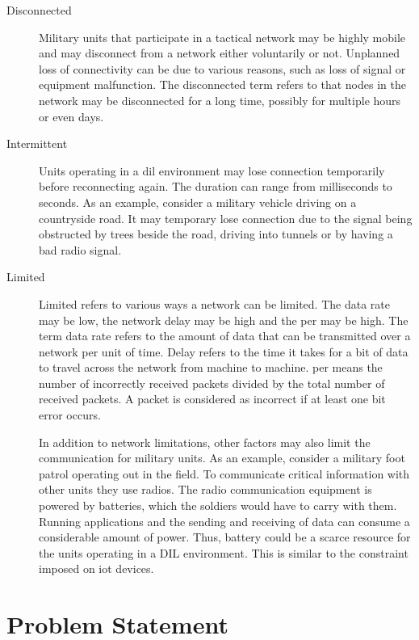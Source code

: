 \begin{description}
\item[Disconnected]

Military units that participate in a tactical network may be highly mobile and
may disconnect from a network either voluntarily or not. Unplanned loss of
connectivity can be due to various reasons, such as loss of signal or equipment
malfunction.  The disconnected term refers to that nodes in the network may be
disconnected for a long time, possibly for multiple hours or even days.

\item[Intermittent]

Units operating in a \gls{dil} environment may lose connection temporarily before
reconnecting again. The duration can range from milliseconds to seconds. As an
example, consider a military vehicle driving on a countryside road. It may
temporary lose connection due to the signal being obstructed by trees beside
the road, driving into tunnels or by having a bad radio signal.

\item[Limited] Limited refers to various ways a network can be limited. The data
rate may be low, the network delay may be high and the \gls{per} may be high.
The term data rate refers to the amount of data that can be transmitted over a
network per unit of time. Delay refers to the time it takes for a bit of data to
travel across the network from machine to machine. \gls{per} means the number of
incorrectly received packets divided by the total number of received packets. A
packet is considered as incorrect if at least one bit error occurs.

In addition to network limitations, other factors may also limit the
communication for military units. As an example, consider a military foot patrol
operating out in the field. To communicate critical information with other units
they use radios. The radio communication equipment is powered by batteries,
which the soldiers would have to carry with them. Running applications and the
sending and receiving of data can consume a considerable amount of power. Thus,
battery could be a scarce resource for the units operating in a DIL environment.
This is similar to the constraint imposed on \gls{iot} devices.

\end{description}


\section{Problem Statement}
\label{section:problem-statement}


